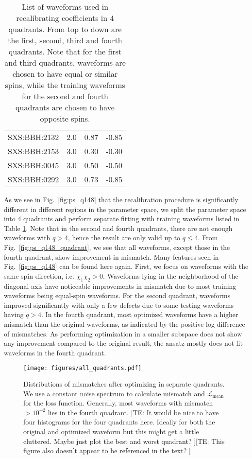 \documentclass[twocolumn]{aastex631}
\newcommand{\te}[1]{{\color{rr}[TE: #1 ]}}
\begin{document}
\begin{table}[t]
\begin{tabularx}{0.8\columnwidth}{@{\extracolsep{\fill}}lrrr}
		SXS:BBH:2132 & 2.0 & 0.87     & -0.85    \\
		SXS:BBH:2153 & 3.0 & 0.30     & -0.30    \\
		SXS:BBH:0045 & 3.0 & 0.50     & -0.50    \\
		SXS:BBH:0292 & 3.0 & 0.73     & -0.85    \\ \midrule\bottomrule
	\end{tabularx}
	\caption{List of waveforms used in recalibrating coefficients in 4 quadrants. From top to down are the first, second, third and fourth quadrants. Note that for the first and third quadrants, waveforms are chosen to have equal or similar spins, while the training waveforms for the second and fourth quadrants are chosen to have opposite spins.}
	\label{tab:quadrants}
\end{table}

As we see in Fig.~\ref{fig:ps_q148} that the recalibration procedure is significantly different in different regions in the parameter space, we split the parameter space into 4 quadrants and perform separate fitting with training waveforms listed in Table \ref{tab:quadrants}. Note that in the second and fourth quadrants, there are not enough waveforms with $q>4$, hence the result are only valid up to $q\leq4$. From Fig.~\ref{fig:ps_q148_quadrant}, we see that all waveforms, except those in the fourth quadrant, show improvement in mismatch. Many features seen in Fig.~\ref{fig:ps_q148} can be found here again. First, we focus on waveforms with the same spin direction, i.e. $\chi_1\chi_2>0$. Waveforms lying in the neighborhood of the diagonal axis have noticeable improvements in mismatch due to most training waveforms being equal-spin waveforms. For the second quadrant, waveforms improved significantly with only a few defects due to some testing waveforms having $q>4$. In the fourth quadrant, most optimized waveforms have a higher mismatch than the original waveforms, as indicated by the positive log difference of mismatches. As performing optimization in a smaller subspace does not show any improvement compared to the original result, the ansatz mostly does not fit waveforms in the fourth quadrant. 

\begin{figure}[t]
	\centering
	\texttt{[image: figures/all\_quadrants.pdf]}
	\caption{Distributions of mismatches after optimizing in separate quadrants. We use a constant noise spectrum to calculate mismatch and $\mathcal{L}_{\mathrm{mean}}$ for the loss function. Generally, most waveforms with mismatch $>10^{-2}$ lies in the fourth quadrant. \te{It would be nice to have four histograms for the four quadrants here. Ideally for both the original and optimized waveform but this might get a little cluttered. Maybe just plot the best and worst quadrant?}\te{This figure also doesn't appear to be referenced in the text?}}
	\label{fig:all_quadrants}
\end{figure}
\end{document}
